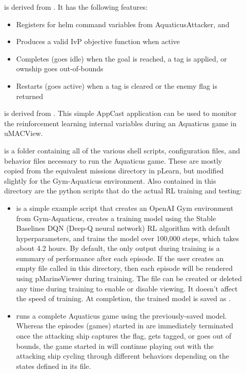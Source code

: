 \documentclass[onecolumn,letterpaper,11pt]{article}
\begin{document}
\begin{description}
\item[] is derived from . It has the following
  features:
  \begin{itemize}
  \item Registers for helm command variables from AquaticusAttacker,
     and 
  \item Produces a valid IvP objective function when active
  \item Completes (goes idle) when the goal is reached, a tag is applied, or
    ownship goes out-of-bounds
  \item Restarts (goes active) when a tag is cleared or the enemy flag is returned
  \end{itemize}
\item[] is derived from . This simple
  AppCast application can be used to monitor the reinforcement learning internal
  variables during an Aquaticus game in uMACView.
\item[] is a folder containing all of the various
  shell scripts,  configuration files, and 
  behavior files necessary to run the Aquaticus game. These are mostly
  copied from the equivalent missions directory in pLearn, but modified
  slightly for the Gym-Aquaticus environment. Also contained in this directory
  are the python scripts that do the actual RL training and testing:
  \begin{itemize}
  \item {} is a simple example script that creates an OpenAI Gym
    environment from Gym-Aquaticus, creates a training model using the Stable Baselines
    DQN (Deep-Q neural network) RL algorithm with default hyperparameters, and trains
    the model over 100,000 steps, which takes about 4.2 hours. By default, the
    only output during training is a summary of performance after each episode.
    If the user creates an empty file called  in this directory, then
    each episode will be rendered using pMarineViewer during training. The 
    file can be created or deleted any time during training to enable or disable
    viewing. It doesn't affect the speed of training. At completion, the trained
    model is saved as .
  \item {} runs a complete Aquaticus game using the previously-saved
    model. Whereas the episodes (games) started in  are immediately terminated
    once the attacking ship captures the flag, gets tagged, or goes out of bounds, the
    game started in  will continue playing out with the attacking
    ship cycling through different behaviors depending on the states defined in its
     file. 
  \end{itemize}
\end{description}
\end{document}
